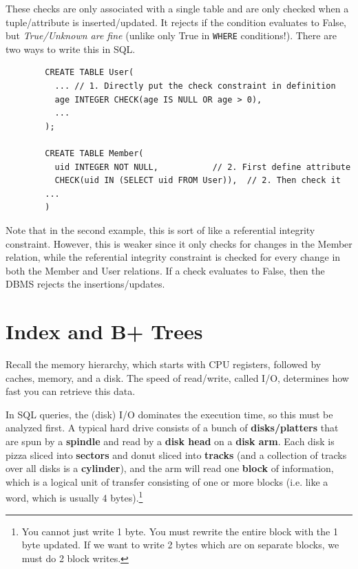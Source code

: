 \documentclass{article}
\begin{document}
    \begin{definition}
      These checks are only associated with a single table and are only checked when a tuple/attribute is inserted/updated. It rejects if the condition evaluates to False, but \textit{True/Unknown are fine} (unlike only True in \texttt{WHERE} conditions!). There are two ways to write this in SQL. 
      \begin{lstlisting}
        CREATE TABLE User(
          ... // 1. Directly put the check constraint in definition
          age INTEGER CHECK(age IS NULL OR age > 0), 
          ...
        ); 

        CREATE TABLE Member(
          uid INTEGER NOT NULL,           // 2. First define attribute 
          CHECK(uid IN (SELECT uid FROM User)),  // 2. Then check it 
        ...
        )
      \end{lstlisting}
      Note that in the second example, this is sort of like a referential integrity constraint. However, this is weaker since it only checks for changes in the Member relation, while the referential integrity constraint is checked for every change in both the Member and User relations. If a check evaluates to False, then the DBMS rejects the insertions/updates. 
    \end{definition}

\section{Index and B+ Trees} 

    Recall the memory hierarchy, which starts with CPU registers, followed by caches, memory, and a disk. The speed of read/write, called I/O, determines how fast you can retrieve this data. 

    \begin{definition}
      In SQL queries, the (disk) I/O dominates the execution time, so this must be analyzed first. A typical hard drive consists of a bunch of \textbf{disks/platters} that are spun by a \textbf{spindle} and read by a \textbf{disk head} on a \textbf{disk arm}. Each disk is pizza sliced into \textbf{sectors} and donut sliced into \textbf{tracks} (and a collection of tracks over all disks is a \textbf{cylinder}), and the arm will read one \textbf{block} of information, which is a logical unit of transfer consisting of one or more blocks (i.e. like a word, which is usually 4 bytes).\footnote{You cannot just write 1 byte. You must rewrite the entire block with the 1 byte updated. If we want to write 2 bytes which are on separate blocks, we must do 2 block writes.} 
    \end{definition}
\end{document}
